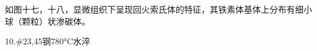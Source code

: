 \documentclass[a4paper,utf8]{article}
\begin{document}
如图十七，十八，显微组织下呈现回火索氏体的特征，其铁素体基体上分布有细小球（颗粒）状渗碳体。
\begin{figure}[!ht]
    \begin{floatrow}
            
    \end{floatrow}

\end{figure}

10.\#23,45钢780°C水淬
\end{document}
